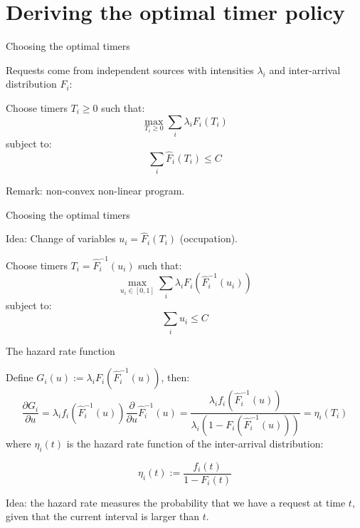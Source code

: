 \documentclass[aspectratio=169]{beamer}
\begin{document}
\section{Deriving the optimal timer policy}

\begin{frame}{Choosing the optimal timers}

	Requests come from independent sources with intensities $\lambda_i$ and inter-arrival distribution $F_i$:

	\vfill

	\begin{problem}
		Choose timers $T_i\geqslant 0$ such that:
		\begin{equation*}
			\max_{T_i\geqslant 0} \sum_i \lambda_i F_i(T_i)
		\end{equation*}
		subject to:
		\begin{equation*}
			\sum_i \hat{F}_i(T_i) \leqslant C
		\end{equation*}
	\end{problem}

	\vfill
	\alert{Remark:} non-convex non-linear program.
\end{frame}

\begin{frame}{Choosing the optimal timers}

	\alert{Idea:} Change of variables $u_i = \hat{F}_i (T_i)$ (occupation).
	\vfill

	\begin{problem}
		Choose timers $T_i = \hat{F}_i^{-1}(u_i)$ such that:
		\begin{equation*}
			\max_{u_i\in[0,1]} \sum_i \lambda_i F_i(\hat{F}^{-1}_i(u_i))
		\end{equation*}
		subject to:
		\begin{equation*}
			\sum_i u_i \leqslant C
		\end{equation*}
	\end{problem}

	\vfill
\end{frame}

\begin{frame}{The hazard rate function}

	Define $G_i(u) := \lambda_i F_i(\hat{F}^{-1}_i(u))$, then:
	\begin{equation*}
		\frac{\partial G_i}{\partial u} = \lambda_i f_i(\hat{F}^{-1}_i(u)) \frac{\partial}{\partial u} \hat{F}^{-1}_i(u) = \frac{\lambda_i f_i(\hat{F}^{-1}_i(u))}{\lambda_i (1-F_i(\hat{F}^{-1}_i(u)))} = \eta_i(T_i)
	\end{equation*}
		where $\eta_i(t)$ is the \alert{hazard rate function} of the inter-arrival distribution:

		\begin{equation*}
			\eta_i(t) := \frac{f_i(t)}{1-F_i(t)}
		\end{equation*}

		\vfill
	\alert{Idea:} the hazard rate measures the probability that we have a request at time $t$, given that the current interval is larger than $t$.
\end{frame}
\end{document}
